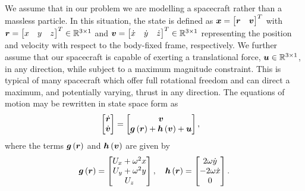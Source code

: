 \documentclass[]{aiaa-tc}%
\begin{document}
We assume that in our problem we are modelling a spacecraft rather than a massless particle.
In this situation, the state is defined as \( \bm{x} = \begin{bmatrix}\bm{r} &\bm{v} \end{bmatrix}^T\) with \(\bm{r} = \begin{bmatrix} x & y & z \end{bmatrix}^T \in \mathbb{R}^{3\times1}\) and \(\bm{v}= \begin{bmatrix} \dot{x} & \dot{y} & \dot{z} \end{bmatrix}^T \in \mathbb{R}^{3\times1}\) representing the position and velocity with respect to the body-fixed frame, respectively.
We further assume that our spacecraft is capable of exerting a translational force, \( \bm{u} \in \mathbb{R}^{3\times1} \), in any direction, while subject to a maximum magnitude constraint.
This is typical of many spacecraft which offer full rotational freedom and can direct a maximum, and potentially varying, thrust in any direction.
The equations of motion may be rewritten in state space form as
\begin{align}\label{eq:state_space_eoms}
	\begin{bmatrix} \dot{\bm{r}} \\ \dot{\bm{v}} \end{bmatrix} &=
	\begin{bmatrix}\bm{v} \\ \bm{g} \left( \bm{r} \right) + \bm{h}\left( \bm{v} \right) + \bm{u} \end{bmatrix} ,
\end{align}
where the terms \(\bm{g} \left( \bm{r} \right) \) and \( \bm{h}\left( \bm{v} \right) \) are given by
\begin{align}\label{eq:state_space_terms}
	\bm{g}\left( \bm{r} \right) = \begin{bmatrix}  U_x + \omega^2 x \\ U_y + \omega^2 y \\ U_z \end{bmatrix} ,\quad
	\bm{h}\left( \bm{r} \right) = \begin{bmatrix} 2 \omega \dot{y} \\ -2 \omega \dot{x} \\ 0 \end{bmatrix} .
\end{align}
\end{document}

